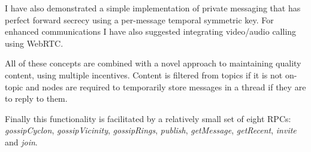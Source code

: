 \documentclass[10pt,a4paper,onecolumn]{article}
\begin{document}
I have also demonstrated a simple implementation of private messaging that has perfect forward secrecy using a per-message temporal symmetric key. For enhanced communications I have also suggested integrating video/audio calling using WebRTC. 

All of these concepts are combined with a novel approach to maintaining quality content, using multiple incentives. Content is filtered from topics if it is not on-topic and nodes are required to temporarily store messages in a thread if they are to reply to them.

Finally this functionality is facilitated by a relatively small set of eight RPCs: \textit{gossipCyclon}, \textit{gossipVicinity}, \textit{gossipRings}, \textit{publish}, \textit{getMessage}, \textit{getRecent}, \textit{invite} and \textit{join}. 

{}

\end{document}
